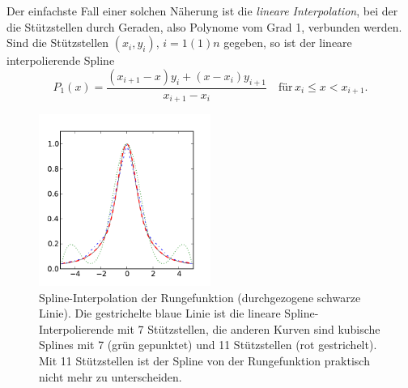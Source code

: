 Der einfachste Fall einer solchen Näherung ist die \emph{lineare
  Interpolation}, bei der die
Stützstellen durch Geraden, also Polynome vom Grad 1, verbunden
werden. Sind die Stützstellen $(x_i, y_i)$, $i=1(1)n$ gegeben, so ist
der lineare interpolierende Spline
\begin{equation}
  P_1(x) = \frac{(x_{i+1} - x)y_i + (x - x_i)y_{i+1}}
  {x_{i+1}-x_i}
  \quad\text{für}\, x_i \le x < x_{i+1}.
\end{equation}

\begin{figure}
  \centering
  \includegraphics[width=0.5\textwidth]{plots/splines}
  \caption{Spline-Interpolation der Rungefunktion (durchgezogene
    schwarze Linie). Die gestrichelte blaue Linie ist die lineare
    Spline-Interpolierende mit 7 Stützstellen, die anderen Kurven sind
    kubische Splines mit 7 (grün gepunktet) und 11 Stützstellen (rot
    gestrichelt). Mit 11 Stützstellen ist der Spline von der
    Rungefunktion praktisch nicht mehr zu unterscheiden.}
  \label{fig:spline}
\end{figure}

